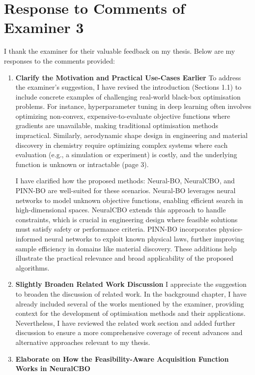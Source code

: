 \documentclass[12pt]{article}
\begin{document}
\section*{Response to Comments of Examiner 3}
I thank the examiner for their valuable feedback on my thesis. Below are my responses to the comments provided:
\begin{enumerate}[leftmargin=0pt, label={\textbf{\arabic*.}}, itemsep=2em]
\item \textbf{Clarify the Motivation and Practical Use-Cases Earlier}
To address the examiner's suggestion, I have revised the introduction (Sections 1.1) to include concrete examples of challenging real-world black-box optimisation problems. For instance, hyperparameter tuning in deep learning often involves optimizing non-convex, expensive-to-evaluate objective functions where gradients are unavailable, making traditional optimisation methods impractical. Similarly, aerodynamic shape design in engineering and material discovery in chemistry require optimizing complex systems where each evaluation (e.g., a simulation or experiment) is costly, and the underlying function is unknown or intractable  (page 3).

I have clarified how the proposed methods: Neural-BO, NeuralCBO, and PINN-BO are well-suited for these scenarios. Neural-BO leverages neural networks to model unknown objective functions, enabling efficient search in high-dimensional spaces. NeuralCBO extends this approach to handle constraints, which is crucial in engineering design where feasible solutions must satisfy safety or performance criteria. PINN-BO incorporates physics-informed neural networks to exploit known physical laws, further improving sample efficiency in domains like material discovery. These additions help illustrate the practical relevance and broad applicability of the proposed algorithms. 
\item \textbf{Slightly Broaden Related Work Discussion}
I appreciate the suggestion to broaden the discussion of related work. In the background chapter, I have already included several of the works mentioned by the examiner, providing context for the development of optimisation methods and their applications. Nevertheless, I have reviewed the related work section and added further discussion to ensure a more comprehensive coverage of recent advances and alternative approaches relevant to my thesis.
\item \textbf{Elaborate on How the Feasibility-Aware Acquisition Function Works in NeuralCBO}


\end{enumerate}
\end{document}
